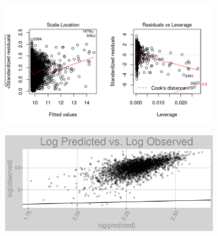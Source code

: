 \begin{figure}[h]
\centering
\begin{subfigure}{1\textwidth}
\centering
\includegraphics[width=.99\textwidth, height=0.475\textheight]{Images/natural_gas_psf_lp_res_2.png}
\end{subfigure}
\begin{subfigure}{1\textwidth}
\centering
\includegraphics[width=.99\textwidth, height=0.3\textheight]{Images/natural_gas_psf_lp_pvo.png}
\end{subfigure}
\end{figure}
\FloatBarrier
\newpage
